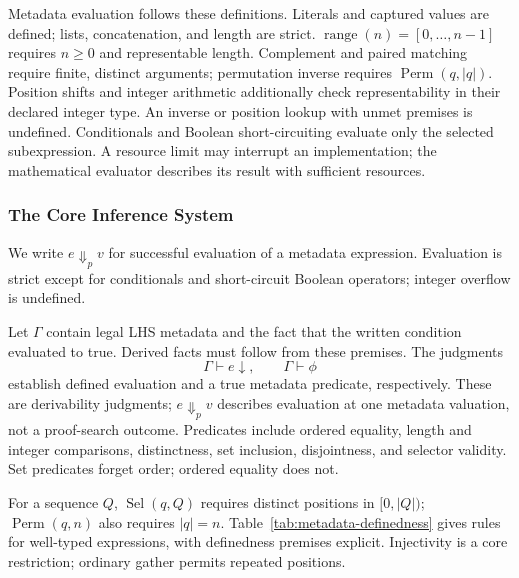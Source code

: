 Metadata evaluation follows these definitions. Literals and captured values
are defined; lists, concatenation, and length are strict.
$\operatorname{range}(n)=[0,\ldots,n-1]$ requires $n\ge0$ and representable
length. Complement and paired matching require finite, distinct arguments;
permutation inverse requires $\operatorname{Perm}(q,|q|)$. Position shifts
and integer arithmetic additionally check representability in their declared
integer type. An inverse or position lookup with unmet premises is
undefined. Conditionals and Boolean short-circuiting evaluate only the
selected subexpression. A resource limit may interrupt an implementation;
the mathematical evaluator describes its result with sufficient resources.

\subsubsection{The Core Inference System}
We write $e\Downarrow_p v$ for successful evaluation of a metadata
expression. Evaluation is strict except for conditionals and short-circuit
Boolean operators; integer overflow is undefined.

Let $\Gamma$ contain legal LHS metadata and the fact that the written
condition evaluated to true. Derived facts must follow from these
premises. The judgments
\begin{equation}
 \Gamma\vdash e\downarrow,\qquad \Gamma\vdash\phi
 \label{eq:metadata-judgments}
\end{equation}
establish defined evaluation and a true metadata predicate, respectively.
These are derivability judgments; $e\Downarrow_p v$ describes evaluation
at one metadata valuation, not a proof-search outcome.
Predicates include ordered equality, length and integer comparisons,
distinctness, set inclusion, disjointness, and selector validity.
Set predicates forget order; ordered equality does not.

For a sequence $Q$, $\operatorname{Sel}(q,Q)$ requires distinct positions
in $[0,|Q|)$; $\operatorname{Perm}(q,n)$ also requires $|q|=n$.
Table~\ref{tab:metadata-definedness} gives rules for well-typed expressions,
with definedness premises explicit. Injectivity is a core restriction;
ordinary gather permits repeated positions.

